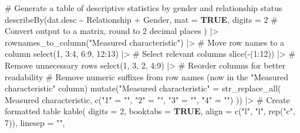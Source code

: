 \documentclass[
  bookmarksnumbered]{article}
\newenvironment{Shaded}{\begin{snugshade}}{\end{snugshade}}
\newcommand{\AttributeTok}[1]{\textcolor[rgb]{0.80,0.80,0.80}{#1}}
\newcommand{\CommentTok}[1]{\textcolor[rgb]{0.50,0.62,0.50}{#1}}
\newcommand{\ConstantTok}[1]{\textcolor[rgb]{0.86,0.64,0.64}{\textbf{#1}}}
\newcommand{\DecValTok}[1]{\textcolor[rgb]{0.86,0.86,0.80}{#1}}
\newcommand{\FunctionTok}[1]{\textcolor[rgb]{0.94,0.94,0.56}{#1}}
\newcommand{\NormalTok}[1]{\textcolor[rgb]{0.80,0.80,0.80}{#1}}
\newcommand{\OtherTok}[1]{\textcolor[rgb]{0.94,0.94,0.56}{#1}}
\newcommand{\SpecialCharTok}[1]{\textcolor[rgb]{0.86,0.64,0.64}{#1}}
\newcommand{\StringTok}[1]{\textcolor[rgb]{0.80,0.58,0.58}{#1}}
\begin{document}
\begin{Shaded}
\begin{Highlighting}[]
\CommentTok{\# Generate a table of descriptive statistics by gender and relationship status}
\FunctionTok{describeBy}\NormalTok{(dat.desc }\SpecialCharTok{\textasciitilde{}}\NormalTok{ Relationship }\SpecialCharTok{+}\NormalTok{ Gender,}
  \AttributeTok{mat =} \ConstantTok{TRUE}\NormalTok{, }\AttributeTok{digits =} \DecValTok{2} \CommentTok{\# Convert output to a matrix, round to 2 decimal places}
\NormalTok{) }\SpecialCharTok{|\textgreater{}}
  \FunctionTok{rownames\_to\_column}\NormalTok{(}\StringTok{"Measured characteristic"}\NormalTok{) }\SpecialCharTok{|\textgreater{}} \CommentTok{\# Move row names to a column}
  \FunctionTok{select}\NormalTok{(}\DecValTok{1}\NormalTok{, }\DecValTok{3}\SpecialCharTok{:}\DecValTok{4}\NormalTok{, }\DecValTok{6}\SpecialCharTok{:}\DecValTok{9}\NormalTok{, }\DecValTok{12}\SpecialCharTok{:}\DecValTok{13}\NormalTok{) }\SpecialCharTok{|\textgreater{}} \CommentTok{\# Select relevant columns}
  \FunctionTok{slice}\NormalTok{(}\SpecialCharTok{{-}}\NormalTok{(}\DecValTok{1}\SpecialCharTok{:}\DecValTok{12}\NormalTok{)) }\SpecialCharTok{|\textgreater{}} \CommentTok{\# Remove unnecessary rows}
  \FunctionTok{select}\NormalTok{(}\DecValTok{1}\NormalTok{, }\DecValTok{3}\NormalTok{, }\DecValTok{2}\NormalTok{, }\DecValTok{4}\SpecialCharTok{:}\DecValTok{9}\NormalTok{) }\SpecialCharTok{|\textgreater{}} \CommentTok{\# Reorder columns for better readability}
  \CommentTok{\# Remove numeric suffixes from row names (now in the "Measured characteristic" column)}
  \FunctionTok{mutate}\NormalTok{(}\StringTok{"Measured characteristic"} \OtherTok{=} \FunctionTok{str\_replace\_all}\NormalTok{(}
    \StringTok{\textasciigrave{}}\AttributeTok{Measured characteristic}\StringTok{\textasciigrave{}}\NormalTok{, }\FunctionTok{c}\NormalTok{(}\StringTok{"1"} \OtherTok{=} \StringTok{""}\NormalTok{, }\StringTok{"2"} \OtherTok{=} \StringTok{""}\NormalTok{, }\StringTok{"3"} \OtherTok{=} \StringTok{""}\NormalTok{, }\StringTok{"4"} \OtherTok{=} \StringTok{""}\NormalTok{)}
\NormalTok{  )) }\SpecialCharTok{|\textgreater{}}
  \CommentTok{\# Create formatted table}
  \FunctionTok{kable}\NormalTok{(}
    \AttributeTok{digits =} \DecValTok{2}\NormalTok{, }\AttributeTok{booktabs =} \ConstantTok{TRUE}\NormalTok{, }\AttributeTok{align =} \FunctionTok{c}\NormalTok{(}\StringTok{"l"}\NormalTok{, }\StringTok{"l"}\NormalTok{, }\FunctionTok{rep}\NormalTok{(}\StringTok{"c"}\NormalTok{, }\DecValTok{7}\NormalTok{)), }
    \AttributeTok{linesep =} \StringTok{""}\NormalTok{,}

\end{Highlighting}
\end{Shaded}
\end{document}
